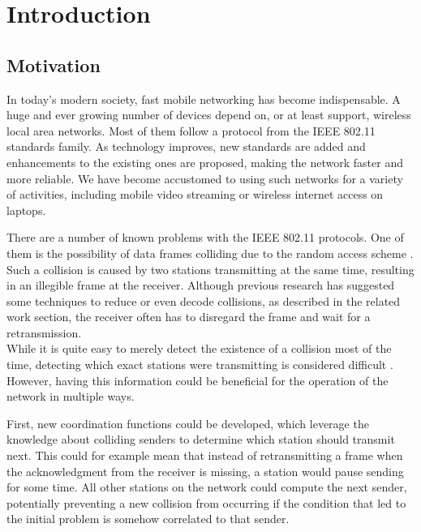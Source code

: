 
\chapter{Introduction}\label{ch:introduction}
\glsresetall %
 



\section{Motivation}

In today's modern society, fast mobile networking has become indispensable. A huge and ever growing number of devices depend on, or at least support, wireless local area networks. Most of them follow a protocol from the \gls{IEEE} 802.11 standards family. As technology improves, new standards are added and enhancements to the existing ones are proposed, making the network faster and more reliable. We have become accustomed to using such networks for a variety of activities, including mobile video streaming or wireless internet access on laptops.

There are a number of known problems with the \gls{IEEE} 802.11 protocols. One of them is the possibility of data frames colliding due to the random access scheme \cite{bianchi2000}. Such a collision is caused by two stations transmitting at the same time, resulting in an illegible frame at the receiver. Although previous research has suggested some techniques to reduce or even decode collisions, as described in the related work section, the receiver often has to disregard the frame and wait for a retransmission.\\

While it is quite easy to merely detect the existence of a collision most of the time, detecting which exact stations were transmitting is considered difficult \cite{choi2013, keene2010}. However, having this information could be beneficial for the operation of the network in multiple ways.

First, new coordination functions could be developed, which leverage the knowledge about colliding senders to determine which station should transmit next. This could for example mean that instead of retransmitting a frame when the acknowledgment from the receiver is missing, a station would pause sending for some time. All other stations on the network could compute the next sender, potentially preventing a new collision from occurring if the condition that led to the initial problem is somehow correlated to that sender.

